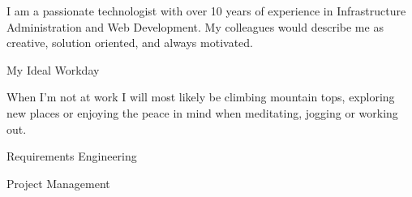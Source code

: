 




I am a passionate technologist with over 10 years of experience in
Infrastructure Administration and Web Development.
My colleagues would
describe me as
{\color{accent}creative},
{\color{accent}solution oriented},
and always {\color{accent}motivated}.


\vspace{1.9mm}

\begin{center}
{\small\color{body}My Ideal Workday}
\end{center}

\vspace{4.1mm}

When I'm not at work I will most likely be climbing mountain tops, exploring new places or
enjoying the peace in mind when meditating, jogging or working out.




\makebox[0pt][l]{%
  \hspace{1.5cm}
  \raisebox{-\totalheight}[0pt][0pt]{%
   {\color{background}\fontsize{250}{48}\faLaptop}
}}%

Requirements Engineering \hfill{}
\vspace{0.3cm}

Project Management \hfill{}
\vspace{0.3cm}

